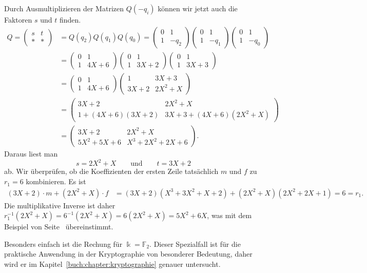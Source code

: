 \begin{beispiel}
Durch Ausmultiplizieren der Matrizen $Q(-q_i)$ können wir jetzt auch die 
Faktoren $s$ und $t$ finden.
\begin{align*}
Q=\begin{pmatrix}
s&t\\
*&*
\end{pmatrix}
&= Q(q_2)Q(q_1)Q(q_0)
=
\begin{pmatrix}0&1\\1&-q_2\end{pmatrix}
\begin{pmatrix}0&1\\1&-q_1\end{pmatrix}
\begin{pmatrix}0&1\\1&-q_0\end{pmatrix}
\\
&=
\begin{pmatrix}
0&1\\
1&4X+6
\end{pmatrix}
\begin{pmatrix}
0&1\\
1&3X+2
\end{pmatrix}
\begin{pmatrix}
0&1\\
1&3X+3
\end{pmatrix}
\\
&=
\begin{pmatrix}
0&1\\
1&4X+6
\end{pmatrix}
\begin{pmatrix}
   1&3X+3\\
3X+2&2X^2 + X
\end{pmatrix}
\\
&=
\begin{pmatrix}
3X+2           &2X^2+X\\
1+(4X+6)(3X+2) &3X+3 + (4X+6)(2X^2+X)
\end{pmatrix}
\\
&=
\begin{pmatrix}
     3X+2 & 2X^2     +X\\
5X^2+5X+6 &  X^3+2X^2+2X+6
\end{pmatrix}.
\end{align*}
Daraus liest man
\[
s
=
2X^2+X
\qquad\text{und}\qquad
t
=
3X+2
\]
ab.
Wir überprüfen, ob die Koeffizienten der ersten Zeile tatsächlich $m$ und $f$
zu $r_1=6$ kombinieren.
Es ist
\begin{align*}
(3X+2)\cdot m + (2X^2+X)\cdot f
&= 
(3X+2)
(X^3+3X^2+X+2)
+
(2X^2+X)
(2X^2+2X+1)
=
6=r_1.
\end{align*}
Die multiplikative Inverse ist daher
$
r_1^{-1}(2X^2 + X)
=
6^{-1}
(2X^2 + X)
=
6
(2X^2 + X)
=
5X^2+6X$,
was mit dem Beispiel von
Seite~\pageref{buch:endlichekoerper:beispiel:inversemitmatrix}
übereinstimmt.
\end{beispiel}

Besonders einfach ist die Rechung für $\Bbbk=\mathbb{F}_2$.
Dieser Spezialfall ist für die praktische Anwendung in der Kryptographie
von besonderer Bedeutung, daher wird er im 
Kapitel~\ref{buch:chapter:kryptographie} genauer untersucht.

